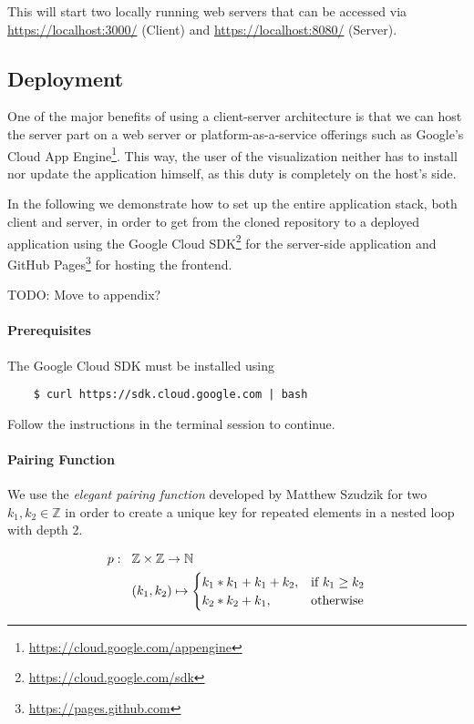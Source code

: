 This will start two locally running web servers that can be accessed via \url{https://localhost:3000/} (Client) and \url{https://localhost:8080/} (Server).


\subsection{Deployment}

One of the major benefits of using a client-server architecture is that we can host the server part on a web server or platform-as-a-service offerings such as Google's Cloud App Engine\footnote{\url{https://cloud.google.com/appengine}}.
This way, the user of the visualization neither has to install nor update the application himself, as this duty is completely on the host's side.

In the following we demonstrate how to set up the entire application stack, both client and server, in order to get from the cloned repository to a deployed application using the Google Cloud SDK\footnote{\url{https://cloud.google.com/sdk}} for the server-side application and GitHub Pages\footnote{\url{https://pages.github.com}} for hosting the frontend.

TODO: Move to appendix?
\paragraph{Prerequisites}   
    
The Google Cloud SDK must be installed using 
\begin{verbatim}
    $ curl https://sdk.cloud.google.com | bash
\end{verbatim}
Follow the instructions in the terminal session to continue. 


\paragraph{Pairing Function}
We use the \textit{elegant pairing function} developed by Matthew Szudzik \cite{szudzik2006elegant} for two $k_1,k_2 \in \mathbb{Z}$ in order to create a unique key for repeated elements in a nested loop with depth 2.

\begin{equation}
    \begin{aligned}
        p: \hspace{0.3cm} & \mathbb{Z} \times \mathbb{Z} \rightarrow \mathbb{N}\\
        & (k_1,k_2) \mapsto
        \begin{cases}
        k_1 * k_1 + k_1 + k_2, & \text{if}\ k_1 \geq k_2 \\
        k_2 * k_2 + k_1, & \text{otherwise}
        \end{cases}
    \end{aligned}
\end{equation}